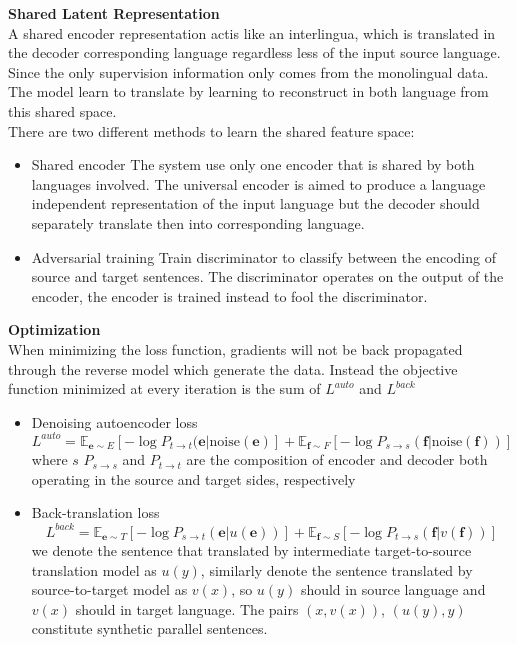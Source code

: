 \textbf{Shared Latent Representation} \\
A shared encoder representation actis like an interlingua, which is translated in the decoder corresponding language regardless less of the input source language. Since the only supervision information only comes from the monolingual data. The model learn to translate by learning to reconstruct in both language from this shared space.\\
There are two different methods to learn the shared feature space:
\begin{itemize}
	\item Shared encoder
	The system use only one encoder that is shared by both languages involved. The universal encoder is aimed to produce a language independent representation of the input language but the decoder should separately translate then into corresponding language.
	\item Adversarial training
	Train discriminator to classify between the encoding of source and target sentences. The discriminator operates on the output of the encoder, the encoder is trained instead to fool the discriminator. 
\end{itemize}



\textbf{Optimization}\\
When minimizing the loss function, gradients will not be back propagated through the reverse model which generate the data. Instead the objective function minimized at every iteration is the sum of $L^{auto}$ and $L^{back}$
\begin{itemize}
	\item Denoising autoencoder loss
	\[ L^{auto} = \mathbb{E}_{\bm{e}\sim E}[-\log P_{t\rightarrow t}(\bm{e}|\text{noise}(\bm{e})] + \mathbb{E}_{\bm{f}\sim F} [-\log P_{s\rightarrow s}(\bm{f}|\text{noise}(\bm{f}))]\]
	where $s$ $P_{s\rightarrow s}$ and $P_{t\rightarrow t}$ are the composition of encoder and decoder both operating in the source and target sides, respectively
	\item Back-translation loss
	\[ L^{back} = \mathbb{E}_{\bm{e}\sim T} [-\log P_{s\rightarrow t}(\bm{e}|u(\bm{e}))] +  \mathbb{E}_{\bm{f}\sim S} [-\log P_{t\rightarrow s}(\bm{f}|v(\bm{f}))]\]
	 we denote the sentence that translated by intermediate target-to-source translation model as $u(y)$, similarly denote the sentence translated by source-to-target model as $v(x)$, so $u(y)$ should in source language and $v(x)$ should in target language. The pairs $(x, v(x))$, $(u(y), y)$ constitute synthetic parallel  sentences.
\end{itemize}

